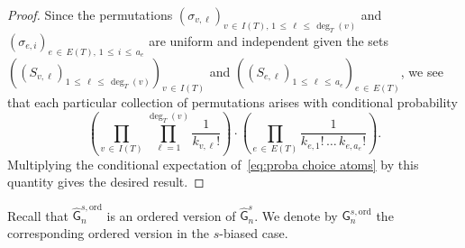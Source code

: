 \documentclass[10pt]{amsart}
\theoremstyle{definition}\newtheorem{defi}[theo]{Definition}\newtheorem{rema}[theo]{Remark}\newtheorem{exam}[theo]{Example}\newtheorem{exem}[theo]{Example}\newtheorem{nota}[theo]{Notation}
\newcommand{\ord}{\mathrm{ord}}
\newcommand{\sG}{\mathsf{G}}
\begin{document}
\begin{proof}
Since the permutations $(\sigma_{v,\ell})_{v\,\in \,I(T),\,1\,\le\,\ell\,\le\,\deg_T(v)}$ and $(\sigma_{e,i})_{e\,\in\,E(T),\,1\,\leq\,i\,\leq\,a_e}$ are uniform and independent given the sets $((S_{v,\ell})_{1\,\le\,\ell\,\le\,\deg_T(v)})_{v\,\in\,I(T)}$ and $((S_{e,\ell})_{1\,\le\,\ell\,\le\,a_e})_{e\,\in\,E(T)}$, we see that each particular collection of permutations arises with conditional probability
\[
\left(\prod_{v\,\in\,I(T)}\prod_{\ell=1}^{\deg_T(v)}\frac{1}{k_{v,\ell}!}\right)\cdot\left(\prod_{e\,\in\, E(T)}\frac{1}{k_{e,1}!\,\dots\,k_{e,a_e}!}\right).
\]
Multiplying the conditional expectation of~\eqref{eq:proba choice atoms} by this quantity gives the desired result.
\end{proof}

Recall that $\widehat{\sG}_{n}^{s,\ord}$ is an ordered version of $\widehat{\sG}_{n}^s$. We denote by $\sG_{n}^{s,\ord}$ the corresponding ordered version in the $s$-biased case.
\end{document}
